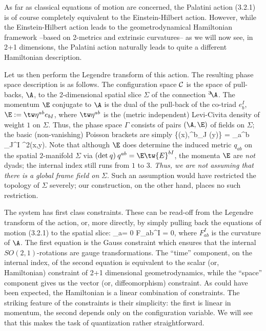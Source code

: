 As far as classical equations of motion are concerned, the Palatini action
(3.2.1) is of course completely equivalent to the Einstein-Hilbert action.
However, while the Einstein-Hilbert action leads to the geometrodynamical
Hamiltonian framework --based on 2-metrics and extrinsic curvatures--
as we will now see, in 2+1 dimensions, the Palatini action naturally
leads to quite a different Hamiltonian description.

Let us then perform the Legendre transform of this action. The
resulting phase space description is as follows. The configuration space
${\cal C}$ is the space of pull-backs, $\A$, to the 2-dimensional spatial
slice $\Sigma$ of the connection ${}^3\!\A$. The momentum $\E$ conjugate
to $\A$ is the dual of the pull-back of the co-triad $e_b^I$, $\E :=
\tw\eta{}^{ab}e_{bI}$, where $\tw\eta{}^{ab}$ is the (metric independent)
Levi-Civita density of weight $1$ on $\Sigma$. Thus, the phase space
$\Gamma$ consists of pairs $(\A,\E)$ of fields on $\Sigma$; the basic
(non-vanishing) Poisson brackets are simply
\bneq
\{\A (x),\>^b_J (y)\} = \delta_a^b\> \delta_J^I \>\delta^2(x,y).
Note that although $\E$ does determine the induced metric $q_{ab}$ on the
spatial $2$-manifold $\Sigma$ via $({\rm det}\- \> q)\>q^{ab} = \E\tw{E}^{bI}$,
the momenta $\E$ are {\it not} dyads; the internal index still runs from $1$
to $3$. {\it Thus, we are not assuming that there is a global frame field on}
$\Sigma$. Such an assumption would have restricted the topology of $\Sigma$
severely; our construction, on the other hand, places no such restriction.

The system has first class constraints. These can be read-off from the
Legendre transform of the action, or, more directly, by simply
pulling back the equations of motion (3.2.1) to the spatial slice:
\bneq
\D_a\E = 0  \qquad F_{ab}^I  = 0,
where $F_{ab}^I$ is the curvature of $\A$. The first equation is the Gauss
constraint which ensures that the internal $SO(2,1)$-rotations are gauge
transformations. The ``time'' component, on the internal index, of the second
equation is equivalent to the scalar (or, Hamiltonian) constraint of 2+1
dimensional geometrodynamics, while the ``space'' component gives us the
vector (or, diffeomorphism) constraint. As could have been expected, the
Hamiltonian is a linear combination of constraints. The striking feature of
the constraints is their
simplicity: the first is linear in momentum, the second depends only on
the configuration variable. We will see that this makes the task of
quantization rather straightforward.

